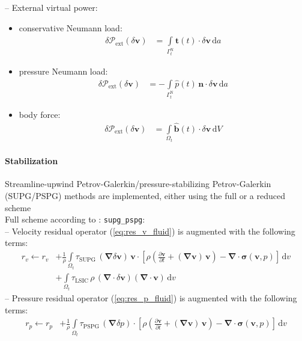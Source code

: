\documentclass[a4paper,12pt]{report}
\newcommand{\bs}[1]{\boldsymbol{#1}}
\newcommand{\Om}{\mathit{\Omega}}
\newcommand{\Gm}{\mathit{\Gamma}}
\begin{document}
-- External virtual power:\\
\begin{itemize}
\item conservative Neumann load:
\begin{align}
\delta \mathcal{P}_{\mathrm{ext}}(\delta\bs{v}) &= \int\limits_{\Gm_t^{\mathrm{N}}} \hat{\bs{t}}(t) \cdot \delta\bs{v} \,\mathrm{d}a \label{eq:deltaPext_neumann}
\end{align}
\item pressure Neumann load:
\begin{align}
\delta \mathcal{P}_{\mathrm{ext}}(\delta\bs{v}) &= -\int\limits_{\Gm_t^{\mathrm{N}}} \hat{p}(t)\,\bs{n} \cdot \delta\bs{v} \,\mathrm{d}a \label{eq:deltaPext_neumann_true}
\end{align}
\item body force:
\begin{align}
\delta \mathcal{P}_{\mathrm{ext}}(\delta\bs{v}) &= \int\limits_{\Om_t} \hat{\bs{b}}(t) \cdot \delta\bs{v} \,\mathrm{d}V \label{eq:deltaPext_body}
\end{align}
\end{itemize}

\paragraph{Stabilization}\label{para:stab}
Streamline-upwind Petrov-Galerkin/pressure-stabilizing Petrov-Galerkin (SUPG/PSPG) methods are implemented, either using the full or a reduced scheme\\

Full scheme according to \cite{tezduyar2000}: \verb.supg_pspg.:\\
-- Velocity residual operator (\ref{eq:res_v_fluid}) is augmented with the following terms:
\begin{align}
r_v \leftarrow r_v &+ \frac{1}{\rho}\int\limits_{\Om_t} \tau_{\mathrm{SUPG}}\,(\bs{\nabla}\delta\bs{v})\,\bs{v} \cdot \left[\rho\left(\frac{\partial \bs{v}}{\partial t} + (\bs{\nabla}\bs{v})\,\bs{v}\right) - \bs{\nabla} \cdot \bs{\sigma}(\bs{v},p)\right]\,\mathrm{d}v \\
& + \int\limits_{\Om_t} \tau_{\mathrm{LSIC}}\,\rho\,(\bs{\nabla}\cdot\delta\bs{v})(\bs{\nabla}\cdot\bs{v})\,\mathrm{d}v
\end{align}
-- Pressure residual operator (\ref{eq:res_p_fluid}) is augmented with the following terms:
\begin{align}
r_p \leftarrow r_p &+ \frac{1}{\rho}\int\limits_{\Om_t} \tau_{\mathrm{PSPG}}\,(\bs{\nabla}\delta p) \cdot \left[\rho\left(\frac{\partial \bs{v}}{\partial t} + (\bs{\nabla}\bs{v})\,\bs{v}\right) - \bs{\nabla} \cdot \bs{\sigma}(\bs{v},p)\right]\,\mathrm{d}v 
\end{align}
\end{document}
